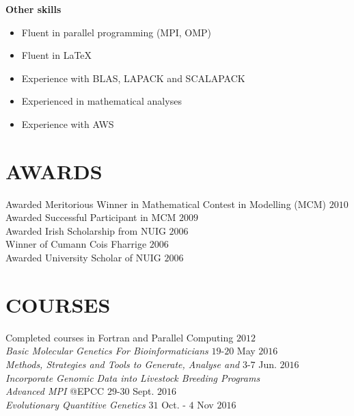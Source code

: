 \documentclass[margin, 10pt]{res} %
\begin{document}
\begin{resume}
{\bf Other skills}
\begin{itemize} \itemsep -2pt
\item Fluent in parallel programming (MPI, OMP)
\item Fluent in LaTeX
\item Experience with BLAS, LAPACK and SCALAPACK
\item Experienced in mathematical analyses
\item Experience with AWS
\end{itemize}

\section{AWARDS}
Awarded Meritorious Winner in Mathematical Contest in Modelling (MCM) \hfill $2010$ \\
Awarded Successful Participant in MCM \hfill  $2009$ \\
Awarded Irish Scholarship from NUIG \hfill $2006$ \\
Winner of Cumann Cois Fharrige \hfill $2006$ \\
Awarded University Scholar of NUIG \hfill $2006$

\section{COURSES}
Completed courses in Fortran and Parallel Computing \hfill $2012$ \\
{\it Basic Molecular Genetics For Bioinformaticians}   \hfill $19$-$20$ May $2016$\\
{\it Methods, Strategies and Tools to Generate, Analyse and}  \hfill  $3$-$7$ Jun. $2016$ \\
\hspace*{0.2in} {\it Incorporate Genomic Data into Livestock Breeding Programs} \\
{\it Advanced MPI} @EPCC \hfill $29$-$30$ Sept. $2016$ \\
{\it Evolutionary Quantitive Genetics} \hfill $31$ Oct. - $4$ Nov $2016$


\end{resume}
\end{document}
